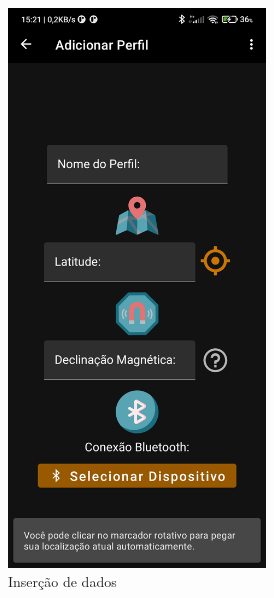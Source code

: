 \begin{figure}[H]
\begin{subfigure}[b]{0.3\textwidth}
		\includegraphics[width=0.75\textwidth]{figuras/desAplicativo/add}
		\caption{Inserção de dados}
		\label{polar}
	\end{subfigure}
	\hfill
	\begin{subfigure}[b]{0.3\textwidth}
		\centering

\end{subfigure}
\end{figure}
